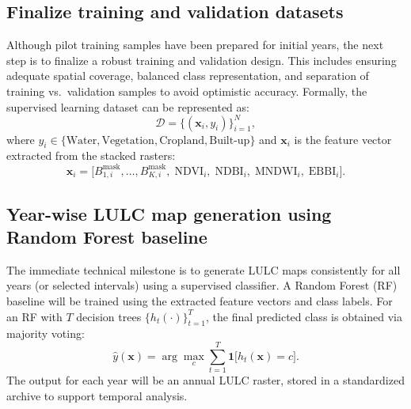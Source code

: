 \subsection{Finalize training and validation datasets}
Although pilot training samples have been prepared for initial years, the next step is to finalize a robust training and validation design. This includes ensuring adequate spatial coverage, balanced class representation, and separation of training vs.\ validation samples to avoid optimistic accuracy. Formally, the supervised learning dataset can be represented as:
\begin{equation}
\mathcal{D} = \{(\mathbf{x}_i, y_i)\}_{i=1}^{N},
\end{equation}
where $y_i \in \{\text{Water}, \text{Vegetation}, \text{Cropland}, \text{Built-up}\}$ and $\mathbf{x}_i$ is the feature vector extracted from the stacked rasters:
\begin{equation}
\mathbf{x}_i =
\bigl[
B^{\text{mask}}_{1,i}, \dots, B^{\text{mask}}_{K,i},\;
\mathrm{NDVI}_i,\; \mathrm{NDBI}_i,\; \mathrm{MNDWI}_i,\; \mathrm{EBBI}_i
\bigr].
\end{equation}

\subsection{Year-wise LULC map generation using Random Forest baseline}
The immediate technical milestone is to generate LULC maps consistently for all years (or selected intervals) using a supervised classifier. A Random Forest (RF) baseline will be trained using the extracted feature vectors and class labels. For an RF with $T$ decision trees $\{h_t(\cdot)\}_{t=1}^{T}$, the final predicted class is obtained via majority voting:
\begin{equation}
\hat{y}(\mathbf{x}) = \arg\max_{c} \sum_{t=1}^{T} \mathbf{1}\bigl[h_t(\mathbf{x}) = c\bigr].
\end{equation}
The output for each year will be an annual LULC raster, stored in a standardized archive to support temporal analysis.

